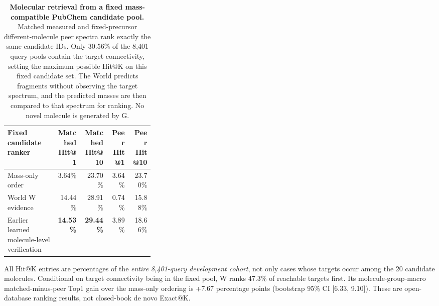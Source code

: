 \begin{table}[!htbp]
\centering
\caption{\textbf{Molecular retrieval from a fixed mass-compatible PubChem candidate pool.} Matched measured and fixed-precursor different-molecule peer spectra rank exactly the same candidate IDs. Only 30.56\% of the 8,401 query pools contain the target connectivity, setting the maximum possible Hit@K on this fixed candidate set. The World predicts fragments without observing the target spectrum, and the predicted masses are then compared to that spectrum for ranking. No novel molecule is generated by G.}
\label{tab:msdev_pubchem}
\small
\setlength{\tabcolsep}{3pt}
\begin{tabular}{p{0.34\linewidth}rrrr}
\toprule
Fixed candidate ranker & Matched Hit@1 & Matched Hit@10 & Peer Hit@1 & Peer Hit@10 \\
\midrule
Mass-only order & 3.64\% & 23.70\% & 3.64\% & 23.70\% \\
World W evidence & 14.44\% & 28.91\% & 0.74\% & 15.88\% \\
Earlier learned molecule-level verification & \textbf{14.53\%} & \textbf{29.44\%} & 3.89\% & 18.66\% \\
\bottomrule
\end{tabular}

\vspace{3pt}
\begin{minipage}{0.97\linewidth}\footnotesize
All Hit@K entries are percentages of the \emph{entire 8,401-query development cohort}, not only cases whose targets occur among the 20 candidate molecules. Conditional on target connectivity being in the fixed pool, W ranks 47.3\% of reachable targets first. Its molecule-group-macro matched-minus-peer Top1 gain over the mass-only ordering is +7.67 percentage points (bootstrap 95\% CI [6.33, 9.10]). These are open-database ranking results, not closed-book de novo Exact@K.
\end{minipage}
\end{table}


